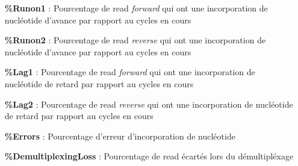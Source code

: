 \begin{itemize}
    \item[\textbf{\%Runon1} :] Pourcentage de read \emph{forward} qui ont une incorporation de nucléotide d'avance par rapport au cycles en cours
    \item[\textbf{\%Runon2} :] Pourcentage de read \emph{reverse} qui ont une incorporation de nucléotide d'avance par rapport au cycles en cours
    \item[\textbf{\%Lag1} :] Pourcentage de read \emph{forward} qui ont une incorporation de nucléotide de retard par rapport au cycles en cours
    \item[\textbf{\%Lag2} :] Pourcentage de read \emph{reverse} qui ont une incorporation de nucléotide de retard par rapport au cycles en cours
    \item[\textbf{\%Errors} :] Pourcentage d'erreur d'incorporation de nucléotide
    \item[\textbf{\%DemultiplexingLoss} :] Pourcentage de read écartés lors du démultipléxage
\end{itemize}




